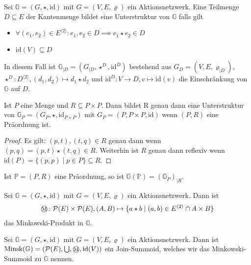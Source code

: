 \documentclass{article}
\newcommand{\mink}{\mathbin{
  \mathchoice
    {\mbox{\normalsize\textcircled{\scriptsize M}}}
    {\mbox{\normalsize\textcircled{\scriptsize M}}}
    {\mbox{\scriptsize\textcircled{\tiny M}}}
    {\mbox{\tiny\textcircled{\fontsize{3.5}{3.5}\selectfont M}}}
  }
}
\begin{document}
\begin{definition}
  Sei $\mathbb{G} = (G, \star, \text{id})$ mit $G = (V, E, \varrho)$ ein Aktionsnetzwerk.
  Eine Teilmenge $D \subseteq E$ der Kantenmenge bildet eine Unterstruktur von $\mathbb{G}$
  falls gilt
  \begin{itemize}
    \item $\forall (e_1, e_2) \in E^{\langle 2 \rangle} \colon e_1, e_2 \in D \implies e_1 \star e_2 \in D$
    \item $\text{id}(V) \subseteq D$
  \end{itemize}
  In diesem Fall ist $\mathbb{G}_{\mid D} = (G_{\mid D}, \star^D, \text{id}^D)$
  bestehend aus $G_D = (V, E, \varrho_{\mid D})$,
  $\star^D \colon D^{\langle 2 \rangle}, (d_1, d_2) \mapsto d_1 \star d_2$
  und $\text{id}^D \colon V \to D, v \mapsto \text{id}(v)$
  die Einschränkung von $\mathbb{G}$ auf $D$.
\end{definition}

\begin{theorem}
  Ist $P$ eine Menge und $R \subseteq P \times P$.
  Dann bildet R genau dann eine Unterstruktur von $\mathbb{G}_P = (G_P, \star, \text{id}_{P \times P})$
  mit $G_P = (P, P \times P, \text{id})$
  wenn $(P, R)$ eine Präordnung ist.
\end{theorem}
\begin{proof}
  Es gilt: $(p, t), (t, q) \in R$ genau dann wenn $(p, q) = (p, t) \star (t, q) \in R$.
  Weiterhin ist $R$ genau dann reflexiv wenn $\text{id}(P) = \{(p, p) \mid p \in P\} \subseteq R$.
\end{proof}

\begin{remark}
  Ist $\mathbb{P} = (P, R)$ eine Präordnung,
  so ist $\mathbb{G}(\mathbb{P}) = (\mathbb{G}_P)_{\mid R}$.
\end{remark}

\begin{definition}
  Sei $\mathbb{G} = (G, \star, \text{id})$ mit $G = (V, E, \varrho)$ ein Aktionsnetzwerk.
  Dann ist
  \begin{equation*}
    \mink \colon \mathcal{P}(E) \times \mathcal{P}(E), (A, B) \mapsto \{a \star b \mid (a, b) \in E^{\langle 2 \rangle} \cap A \times B\}
  \end{equation*}
  das Minkowski-Produkt in $\mathbb{G}$.
\end{definition}

\begin{definition}
  Sei $\mathbb{G} = (G, \star, \text{id})$ mit $G = (V, E, \varrho)$ ein Aktionsnetzwerk.
  Dann ist $\text{Minsk}(\mathbb{G}) = (\mathcal{P}(E), \bigcup, \mink, \text{id}(V))$
  ein Join-Summoid, welches wir das Minkowski-Summoid zu $\mathbb{G}$ nennen.
\end{definition}
\end{document}
